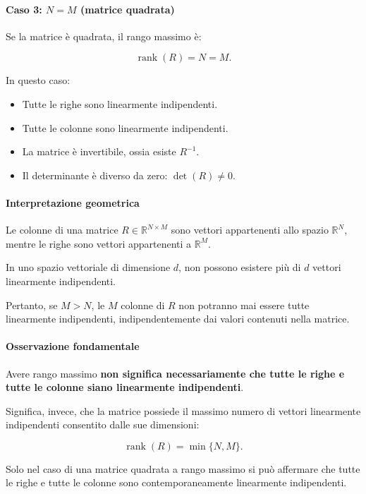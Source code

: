 \paragraph{Caso 3: $N = M$ (matrice quadrata)}

Se la matrice è quadrata, il rango massimo è:

\[
    \operatorname{rank}(R) = N = M.
\]

In questo caso:
\begin{itemize}
    \item Tutte le righe sono linearmente indipendenti.
    \item Tutte le colonne sono linearmente indipendenti.
    \item La matrice è invertibile, ossia esiste $R^{-1}$.
    \item Il determinante è diverso da zero: $\det(R) \neq 0$.
\end{itemize}

\paragraph{Interpretazione geometrica}

Le colonne di una matrice $R \in \mathbb{R}^{N \times M}$ sono vettori appartenenti allo spazio $\mathbb{R}^{N}$, mentre le righe sono vettori appartenenti a $\mathbb{R}^{M}$.

In uno spazio vettoriale di dimensione $d$, non possono esistere più di $d$ vettori linearmente indipendenti.

Pertanto, se $M > N$, le $M$ colonne di $R$ non potranno mai essere tutte linearmente indipendenti, indipendentemente dai valori contenuti nella matrice.

\paragraph{Osservazione fondamentale}

Avere rango massimo \textbf{non significa necessariamente che tutte le righe e tutte le colonne siano linearmente indipendenti}.

Significa, invece, che la matrice possiede il massimo numero di vettori linearmente indipendenti consentito dalle sue dimensioni:

\[
    \boxed{\operatorname{rank}(R) = \min\{N,M\}.}
\]

Solo nel caso di una matrice quadrata a rango massimo si può affermare che tutte le righe e tutte le colonne sono contemporaneamente linearmente indipendenti.


